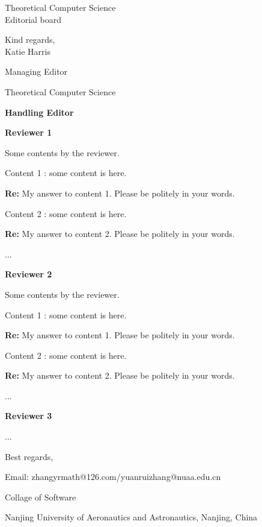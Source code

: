 \documentclass[a4paper,10pt]{letter}
\newcommand{\review}[1]{\hrulefill\par{\Large\textbf{Reviewer #1}}}
\newcommand{\editor}[1]{\hrulefill\par{\Large\textbf{#1}}}
\newcommand{\ranswer}[1]{{\color{blue}\textnormal{\textbf{Re:}} #1}}
\newcommand{\raddress}[1]{{\noindent \setlength{\parskip}{0.1em} \linespread{0.25} #1}}
\begin{document}
\begin{letter}{Theoretical Computer Science\\
    Editorial board}
\vspace{1cm}

Kind regards,
\\

Katie Harris

Managing Editor

Theoretical Computer Science




\editor{Handling Editor}



\review{1}

Some contents by the reviewer. 

Content 1 : some content is here. 

\ranswer{
    My answer to content 1. Please be politely in your words. 
}

Content 2 : some content is here. 

\ranswer{
    My answer to content 2. Please be politely in your words. 
}

...




\review{2}

Some contents by the reviewer. 

Content 1 : some content is here. 

\ranswer{
    My answer to content 1. Please be politely in your words. 
}

Content 2 : some content is here. 

\ranswer{
    My answer to content 2. Please be politely in your words. 
}

...

\review{3}

...


\hrulefill
\vspace{.4in}

\closing{Best regards,}


%

\raddress{

Email: zhangyrmath@126.com/yuanruizhang@nuaa.edu.cn

Collage of Software

Nanjing University of Aeronautics and Astronautics, Nanjing, China
}


\end{letter}
\end{document}
